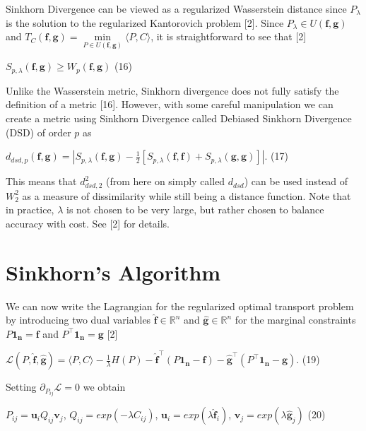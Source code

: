 \documentclass[botnum, fleqn]{unmeethesis}
\begin{document}
 Sinkhorn Divergence can be viewed as a regularized Wasserstein distance since $P_\lambda$ is the solution to the regularized Kantorovich problem [2]. Since $P_\lambda\in U(\bm{f},\bm{g})$ and $T_C(\bm{f},\bm{g})=\min\limits_{P\in U(\bm{f},\bm{g})}\langle P,C \rangle$, it is straightforward to see that [2]

\hspace{\fill}$S_{p,\lambda}(\bm{f},\bm{g}) \ge W_p(\bm{f},\bm{g})$\hspace{\fill} \normalsize (16)

Unlike the Wasserstein metric, Sinkhorn divergence does not fully satisfy the definition of a metric [16]. However, with some careful manipulation we can create a metric using Sinkhorn Divergence called Debiased Sinkhorn Divergence (DSD) of order $p$ as

\hspace{\fill}$d_{dsd,p}(\bm{f},\bm{g})=|S_{p,\lambda}(\bm{f},\bm{g})-\frac{1}{2}[S_{p,\lambda}(\bm{f},\bm{f})+S_{p,\lambda}(\bm{g},\bm{g})]|$.\hspace{\fill} \normalsize (17)


\noindent This means that $d_{dsd,2}^2$ (from here on simply called $d_{dsd}$) can be used instead of $W_2^2$ as a measure of dissimilarity while still being a distance function. Note that in practice, $\lambda$ is not chosen to be very large, but rather chosen to balance accuracy with cost. See [2] for details.
\section{\label{section:Sinkhorn's Algorithm}Sinkhorn's Algorithm}
We can now write the Lagrangian for the regularized optimal transport problem by introducing two dual variables $\bm{\widehat{f}}\in\mathbb{R}^n$ and $\bm{\widehat{g}}\in\mathbb{R}^n$ for the marginal constraints $P\bm{1_n}=\bm{f}$ and $P^\top \bm{1_n}=\bm{g}$ [2]

\hspace{\fill}$\mathcal{L}(P,\bm{\widehat{f}},\bm{\widehat{g}})=\langle P,C \rangle -\frac{1}{\lambda}H(P)-\bm{\widehat{f}}^\top(P\bm{1_n}-\bm{f})-\bm{\widehat{g}}^\top(P^\top\bm{1_n}-\bm{g})$.\hspace{\fill} \normalsize (19)

Setting $\partial_{P_{ij}}\mathcal{L}=0$ we obtain

\hspace{\fill}$P_{ij}=\bm{u}_iQ_{ij}\bm{v}_j$, \hspace{0.2cm}$Q_{ij}=exp(-\lambda C_{ij})$, \hspace{0.2cm}$\bm{u}_i=exp(\lambda \bm{\widehat{f}}_i)$, \hspace{0.2cm}$\bm{v}_j=exp(\lambda \bm{\widehat{g}}_j)$\hspace{\fill} \normalsize (20)
\end{document}
